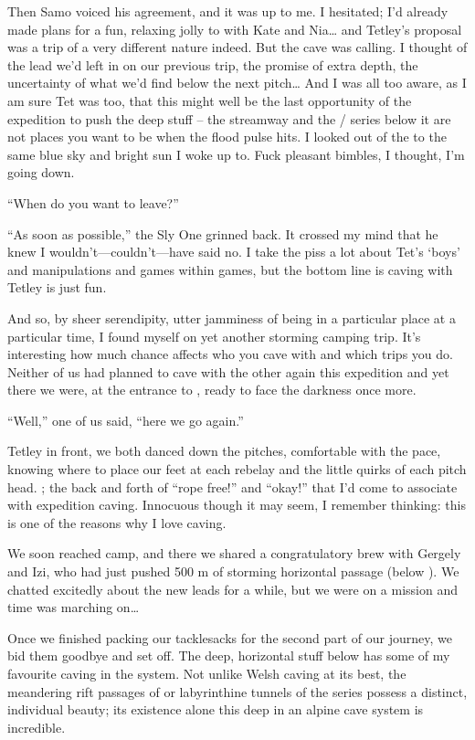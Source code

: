 Then Samo voiced his agreement, and it was up to me. I hesitated; I'd
already made plans for a fun, relaxing jolly to  with Kate
and Nia\ldots{} and Tetley's proposal was a trip of a very different
nature indeed. But the cave was calling. I thought of the lead we'd left
in  on our previous trip, the promise of extra depth,
the uncertainty of what we'd find below the next pitch\ldots{} And I was
all too aware, as I am sure Tet was too, that this might well be the
last opportunity of the expedition to push the deep stuff -- the
 streamway and the / series
below it are not places you want to be when the flood pulse hits. I
looked out of the  to the same blue sky and bright sun I woke up to.
Fuck pleasant bimbles, I thought, I'm going down.

``When do you want to leave?''

``As soon as possible,'' the Sly One grinned back. It crossed my mind
that he knew I wouldn't---couldn't---have said no. I take the piss a lot
about Tet's `boys' and manipulations and games within games, but the
bottom line is caving with Tetley is just fun.

And so, by sheer serendipity, utter jamminess of being in a particular
place at a particular time, I found myself on yet another storming
camping trip. It's interesting how much chance affects who you cave with
and which trips you do. Neither of us had planned to cave with the other
again this expedition and yet there we were, at the entrance to
, ready to face the darkness once more.

``Well,'' one of us said, ``here we go again.''

Tetley in front, we both danced down the pitches, comfortable with the
pace, knowing where to place our feet at each rebelay and the little
quirks of each pitch head. ;
the back and forth of ``rope free!'' and ``okay!'' that I'd come to
associate with expedition caving. Innocuous though it may seem, I
remember thinking: this is one of the reasons why I love caving.

We soon reached camp, and there we shared a congratulatory brew with
Gergely and Izi, who had just pushed 500 m of storming horizontal
passage (below ). We chatted excitedly about the
new leads for a while, but we were on a mission and time was marching
on\ldots{}

Once we finished packing our tacklesacks for the second part of our
journey, we bid them goodbye and set off. The deep, horizontal stuff
below  has some of my favourite caving in
the system. Not unlike Welsh caving at its best, the meandering rift
passages of  or labyrinthine tunnels of the  series
possess a distinct, individual beauty; its existence alone this deep in
an alpine cave system is incredible.


